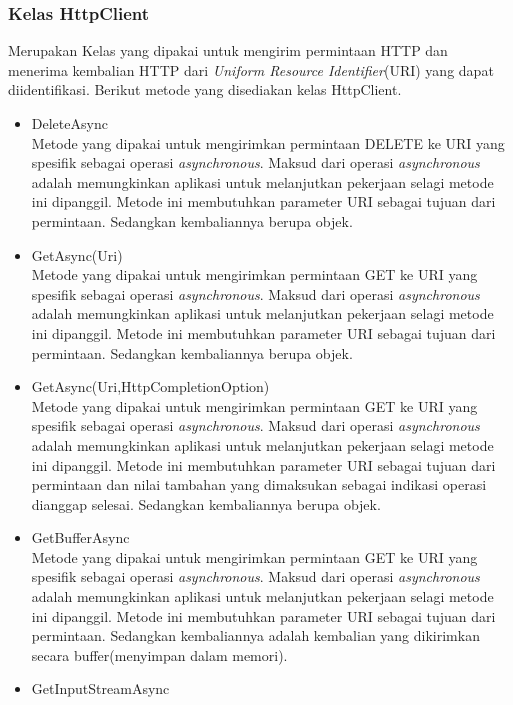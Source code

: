 \subsubsection{Kelas HttpClient}
\label{subsubsec:Kelas HttpClient}
\hspace{0.5cm} Merupakan Kelas yang dipakai untuk mengirim permintaan HTTP dan menerima kembalian HTTP dari \textit{Uniform Resource Identifier}(URI) yang dapat diidentifikasi. Berikut metode yang disediakan kelas HttpClient.
\begin{itemize}
	\item DeleteAsync \\
	Metode yang dipakai untuk mengirimkan permintaan DELETE ke URI yang spesifik sebagai operasi \textit{asynchronous}. Maksud dari operasi \textit{asynchronous} adalah memungkinkan aplikasi untuk melanjutkan pekerjaan selagi metode ini dipanggil\footnotemark[2]. Metode ini membutuhkan parameter URI sebagai tujuan dari permintaan. Sedangkan kembaliannya berupa objek.
	\item GetAsync(Uri) \\
	Metode yang dipakai untuk mengirimkan permintaan GET ke URI yang spesifik sebagai operasi \textit{asynchronous}. Maksud dari operasi \textit{asynchronous} adalah memungkinkan aplikasi untuk melanjutkan pekerjaan selagi metode ini dipanggil\footnotemark[2]. Metode ini membutuhkan parameter URI sebagai tujuan dari permintaan. Sedangkan kembaliannya berupa objek.
	\item GetAsync(Uri,HttpCompletionOption) \\
	Metode yang dipakai untuk mengirimkan permintaan GET ke URI yang spesifik sebagai operasi \textit{asynchronous}. Maksud dari operasi \textit{asynchronous} adalah memungkinkan aplikasi untuk melanjutkan pekerjaan selagi metode ini dipanggil\footnotemark[2]. Metode ini membutuhkan parameter URI sebagai tujuan dari permintaan dan nilai tambahan yang dimaksukan sebagai indikasi operasi dianggap selesai. Sedangkan kembaliannya berupa objek.
	\item GetBufferAsync \\
	Metode yang dipakai untuk mengirimkan permintaan GET ke URI yang spesifik sebagai operasi \textit{asynchronous}. Maksud dari operasi \textit{asynchronous} adalah memungkinkan aplikasi untuk melanjutkan pekerjaan selagi metode ini dipanggil\footnotemark[2]. Metode ini membutuhkan parameter URI sebagai tujuan dari permintaan. Sedangkan kembaliannya adalah kembalian yang dikirimkan secara buffer(menyimpan dalam memori).
	\item GetInputStreamAsync \\

\end{itemize}
